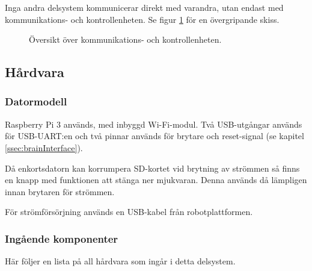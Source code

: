 \documentclass[a4paper,11pt]{article}
\begin{document}
Inga andra delsystem kommunicerar direkt med varandra, utan endast med kommunikations- och kontrollenheten. Se figur \ref{fig:unitBrain} för en övergripande skiss.

\begin{figure}[h!]
    \caption{Översikt över kommunikations- och kontrollenheten.  }
    \label{fig:unitBrain}
\end{figure}

\subsection{Hårdvara}

\subsubsection{Datormodell}
Raspberry Pi 3 används, med inbyggd Wi-Fi-modul. Två USB-utgångar används för USB-UART:en och två pinnar används för brytare och reset-signal (se kapitel \ref{ssec:brainInterface}).

Då enkortsdatorn kan korrumpera SD-kortet vid brytning av strömmen så finns en knapp med funktionen att stänga ner mjukvaran. Denna används då lämpligen innan brytaren för strömmen.

För strömförsörjning används en USB-kabel från robotplattformen.

\subsubsection{Ingående komponenter}
Här följer en lista på all hårdvara som ingår i detta delsystem.

\begin{HardwareList}
\end{HardwareList}
\end{document}
